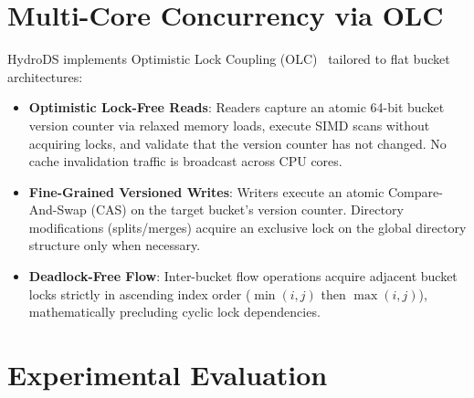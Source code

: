 \documentclass[10pt,twocolumn,letterpaper]{article}
\theoremstyle{definition}
\begin{document}
\section{Multi-Core Concurrency via OLC}
\label{sec:concurrency}

HydroDS implements Optimistic Lock Coupling (OLC)~\cite{leis2013art} tailored to flat bucket architectures:
\begin{itemize}
  \item \textbf{Optimistic Lock-Free Reads}: Readers capture an atomic 64-bit bucket version counter via relaxed memory loads, execute SIMD scans without acquiring locks, and validate that the version counter has not changed. No cache invalidation traffic is broadcast across CPU cores.
  \item \textbf{Fine-Grained Versioned Writes}: Writers execute an atomic Compare-And-Swap (CAS) on the target bucket's version counter. Directory modifications (splits/merges) acquire an exclusive lock on the global directory structure only when necessary.
  \item \textbf{Deadlock-Free Flow}: Inter-bucket flow operations acquire adjacent bucket locks strictly in ascending index order ($\min(i, j)$ then $\max(i, j)$), mathematically precluding cyclic lock dependencies.
\end{itemize}

\section{Experimental Evaluation}
\label{sec:eval}
\end{document}
